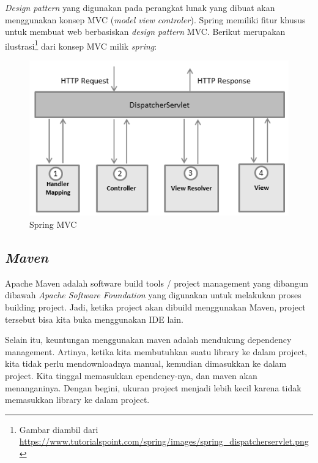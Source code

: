 \textit{Design pattern} yang digunakan pada perangkat lunak yang dibuat akan menggunakan konsep MVC (\textit{model view controler}). Spring memiliki fitur khusus untuk membuat web berbasiskan \textit{design pattern} MVC. Berikut merupakan ilustrasi\footnote{Gambar diambil dari \url{https://www.tutorialspoint.com/spring/images/spring_dispatcherservlet.png}} dari konsep MVC milik \textit{spring}:
\begin{figure}[h]
	\centering
	\includegraphics[scale=0.6]{GambarIO/spring_dispatcherservlet}
	\caption[Spring MVC]{Spring MVC}
	\label{fig:Spring MVC}
\end{figure}


\subsection{\textit{Maven} \cite{MengenalMaven2015EGunawan}}
Apache Maven adalah software build tools / project management yang dibangun dibawah \textit{Apache Software Foundation} yang digunakan untuk melakukan proses building project. Jadi, ketika project akan dibuild menggunakan Maven, project tersebut bisa kita buka menggunakan IDE lain.

Selain itu, keuntungan menggunakan maven adalah mendukung dependency management. Artinya, ketika kita membutuhkan suatu library ke dalam project, kita tidak perlu mendownloadnya manual, kemudian dimasukkan ke dalam project. Kita tinggal memasukkan  ependency-nya, dan maven akan menanganinya.  Dengan begini, ukuran project menjadi lebih kecil karena tidak memasukkan library ke dalam project.

